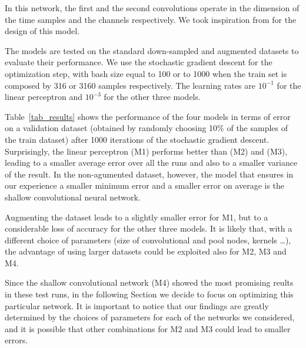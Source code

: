 \documentclass{article}
\begin{document}
\begin{itemize}
In this network, the first and the second convolutions operate in the dimension of the time samples and the channels respectively. We took inspiration from \cite{schirrmeister2017deep} for the design of this model.
\end{itemize}
The models are tested on the standard down-sampled and augmented datasets to evaluate their performance. We use the stochastic gradient descent for the optimization step, with bash size equal to 100 or to 1000 when the train set is composed by 316 or 3160 samples respectively. The learning rates are $10^{-1}$ for the linear perceptron and $10^{-3}$ for the other three models.

Table~\ref{tab_results} shows the performance of the four models in terms of error on a validation dataset (obtained by randomly choosing 10\% of the samples of the train dataset) after 1000 iterations of the stochastic gradient descent. Surprisingly, the linear perceptron (M1) performs better than (M2) and (M3), leading to a smaller average error over all the runs and also to a smaller variance of the result. In the non-agumented dataset, however, the model that ensures in our experience a smaller minimum error and a smaller error on average is the shallow convolutional neural network.

Augmenting the dataset leads to a slightly smaller error for M1, but to a considerable loss of accuracy for the other three models. It is likely that, with a different choice of parameters (size of convolutional and pool nodes, kernels \ldots), the advantage of using larger datasets could be exploited also for M2, M3 and M4. 

Since the shallow convolutional network (M4) showed the most promising reults in these test runs, in the following Section we decide to focus on optimizing this particular network. It is important to notice that our findings are greatly determined by the choices of parameters for each of the networks we considered, and it is possible that other combinations for M2 and M3 could lead to smaller errors.
\end{document}
